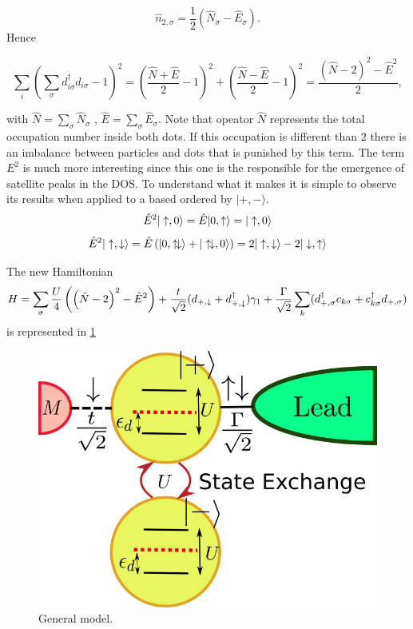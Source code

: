 \[\hat{n}_{2,\sigma}= \frac{1}{2} \left( \hat{N}_\sigma - \hat{E}_\sigma \right).  \]
Hence 

\[\sum_{i} (\sum_{\sigma} d_{i \sigma}^{\dagger}d_{i \sigma}-1)^{2} = \left(\frac{\hat{N} +\hat{E}}{2}-1 \right) ^{2} + \left( \frac{\hat{N} -\hat{E}}{2}-1 \right)^{2} = \frac{\left( \hat{N}-2 \right)^2- \hat{E}^2}{2}, \]

with $\hat{N}=\sum_\sigma \hat{N}_\sigma $ , $\hat{E}=\sum_\sigma \hat{E}_\sigma $. Note that opeator $\hat{N}$ represents the total occupation number inside both dots. If this occupation is different than $2$ there is an imbalance between particles and dots that is punished by this term. The term $E^2$ is much more interesting since this one is the responsible for the emergence of satellite peaks in the DOS. To understand what it makes it is simple to observe its results when applied to a based ordered by $\vert + , - \rangle$. 
\[ \hat{E}^2 \vert \uparrow , 0 \rangle =  \hat{E} \vert 0 , \uparrow \rangle = \vert \uparrow , 0 \rangle   \] 
\[ \hat{E}^2 \vert \uparrow , \downarrow \rangle =  \hat{E} \left( \vert 0 , \uparrow\!\downarrow \rangle + \vert \uparrow\!\downarrow , 0 \rangle \right) = 2\vert \uparrow , \downarrow \rangle - 2\vert \downarrow , \uparrow \rangle  \]





The new Hamiltonian 
\begin{equation}
H = \sum_{\sigma}  \frac{U}{4}\left( \left( \hat{N}-2 \right)^2- \hat{E}^2 \right) + \frac{t}{\sqrt{2}} (d_{+,\downarrow}+d^\dagger_{+,\downarrow})\gamma_1 
 +  \frac{\Gamma}{\sqrt{2}}\sum_{ k}(d^\dagger_{+,\sigma}c_{k\sigma}+c^\dagger_{k\sigma}d_{+,\sigma})
\label{t+}
\end{equation}
is represented in \ref{fig:ExchangeMod}

\begin{figure}[h]
\centering
\includegraphics[scale=0.4]{IMAGES/ExchangeMod.png}
\caption{\label{fig:ExchangeMod}General model.} 
\end{figure}




